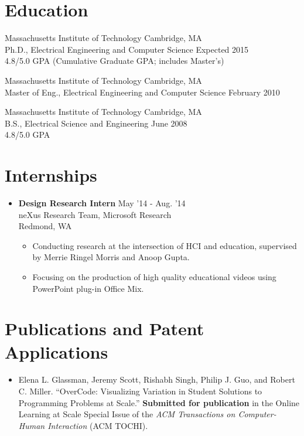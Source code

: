 \documentclass[margin]{res}
\begin{document}
\begin{resume}
\section{Education} 
Massachusetts Institute of Technology \hfill Cambridge, MA \\
Ph.D., Electrical Engineering and Computer Science \hfill Expected 2015\\
4.8/5.0 GPA (Cumulative Graduate GPA; includes Master's)

Massachusetts Institute of Technology \hfill Cambridge, MA \\
Master of Eng., Electrical Engineering and Computer Science \hfill February 2010

Massachusetts Institute of Technology \hfill Cambridge, MA \\
B.S., Electrical Science and Engineering \hfill June 2008 \\
4.8/5.0 GPA

\section{Internships}
\begin{itemize}
\item {\bf Design Research Intern} \hfill May '14 - Aug. '14 \\ neXus Research Team, Microsoft Research \\ Redmond, WA 
 \begin{itemize} \itemsep -2pt  %
 \item Conducting research at the intersection of HCI and education, supervised by Merrie Ringel Morris and Anoop Gupta. 
 \item Focusing on the production of high quality educational videos using PowerPoint plug-in Office Mix.
 \end{itemize}
\end{itemize}
 
\section{Publications and Patent Applications}

\begin{itemize}

\item Elena L. Glassman, Jeremy Scott, Rishabh Singh, Philip J. Guo, and Robert C. Miller. ``OverCode: Visualizing Variation in Student Solutions to Programming Problems at Scale.'' {\bf Submitted for publication} in the Online Learning at Scale Special Issue of the {\it ACM Transactions on Computer-Human Interaction} (ACM TOCHI).


\end{itemize}
\end{resume}
\end{document}
